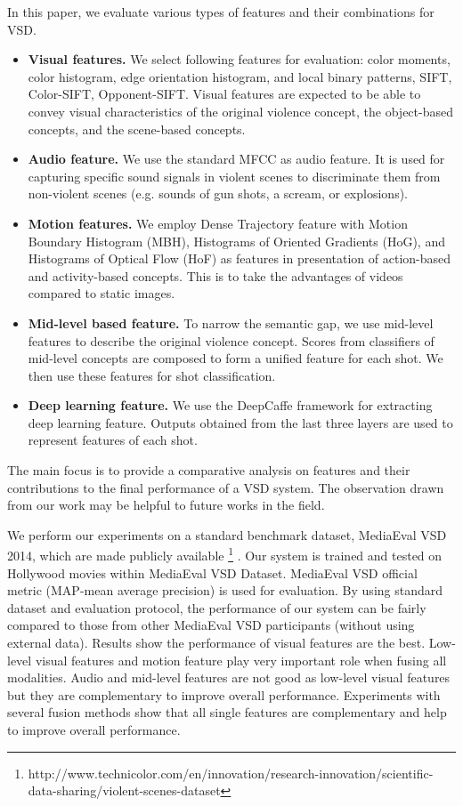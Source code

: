 \documentclass[twocolumn]{bmcart}%
\begin{document}
In this paper, we evaluate various types of features and their combinations for VSD. 
\begin{itemize}
	\item {\bf Visual features.} We select following features for evaluation: color moments, color histogram, edge orientation histogram, and local binary patterns, SIFT, Color-SIFT, Opponent-SIFT. Visual features are expected to be able to convey visual characteristics of the original violence concept, the object-based concepts, and the scene-based concepts.
	\item {\bf Audio feature.} We use the standard MFCC as audio feature. It is used for capturing specific sound signals in violent scenes to discriminate them from non-violent scenes (e.g. sounds of gun shots, a scream, or explosions). 
	\item {\bf Motion features.} We employ Dense Trajectory feature with Motion Boundary Histogram (MBH), Histograms of Oriented Gradients (HoG), and Histograms of Optical Flow (HoF) as features in presentation of action-based and activity-based concepts. This is to take the advantages of videos compared to static images.  
	\item {\bf Mid-level based feature.} To narrow the semantic gap, we use mid-level features to describe the original violence concept. Scores from classifiers of mid-level concepts are composed to form a unified feature for each shot. We then use these features for shot classification.
	\item {\bf Deep learning feature.} We use the DeepCaffe framework for extracting deep learning feature. Outputs obtained from the last three layers are used to represent features of each shot. 
\end{itemize}
The main focus is to provide a comparative analysis on features and their contributions to the final performance of a VSD system. The observation drawn from our work may be helpful to future works in the field.

We perform our experiments on a standard benchmark dataset, MediaEval VSD 2014\cite{demarty2014benchmarking}, which are made publicly available \footnote{http://www.technicolor.com/en/innovation/research-innovation/scientific-data-sharing/violent-scenes-dataset} . Our system is trained and tested on Hollywood movies within MediaEval VSD Dataset. MediaEval VSD official metric (MAP-mean average precision) is used for evaluation. By using standard dataset and evaluation protocol, the performance of our system can be fairly compared to those from other MediaEval VSD participants (without using external data). Results show the performance of visual features are the best. Low-level visual features and motion feature play very important role when fusing all modalities. Audio and mid-level features are not good as low-level visual features but they are complementary to improve overall performance. Experiments with several fusion methods show that all single features are complementary and help to improve overall performance.
\end{document}
